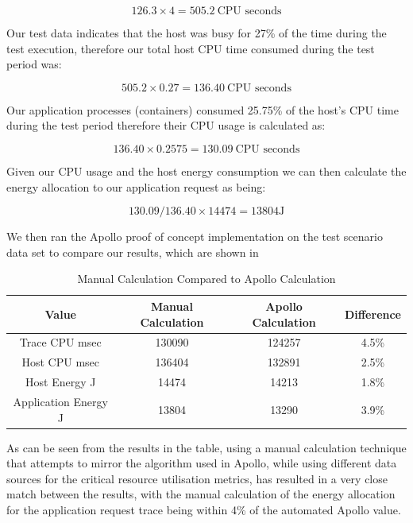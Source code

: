 \begin{equation}
126.3 \times 4 = 505.2 ~\text{CPU seconds}
\end{equation}

Our test data indicates that the host was busy for 27\% of the time during the test execution, therefore our total host CPU time consumed during the test period was:

\begin{equation}
505.2 \times 0.27 = 136.40 ~\text{CPU seconds}
\end{equation}

Our application processes (containers) consumed 25.75\% of the host's CPU time during the test period therefore their CPU usage is calculated as:

\begin{equation}
136.40 \times 0.2575 = 130.09 ~\text{CPU seconds}
\end{equation}

Given our CPU usage and the host energy consumption we can then calculate the energy allocation to our application request as being:

\begin{equation}
130.09 / 136.40 \times 14474 = 13804\text{J}
\end{equation}

We then ran the Apollo proof of concept implementation on the test scenario data set to compare our results, which are shown in 

\begin{table}
\centering
\caption{Manual Calculation Compared to Apollo Calculation}
\label{table:calculationresults}
\footnotesize
\begin{tabular}{|c|c|c|c|}
\hline
Value & Manual Calculation & Apollo Calculation & Difference \\
\hline
\hline
Trace CPU msec       & 130090 & 124257 & 4.5\% \\
Host CPU msec        & 136404 & 132891 & 2.5\% \\
Host Energy J        & 14474  & 14213  & 1.8\% \\
Application Energy J & 13804  & 13290  & 3.9\% \\
\hline
\end{tabular}
\end{table}

As can be seen from the results in the table, using a manual calculation technique that attempts to mirror the algorithm used in Apollo, while using different data sources for the critical resource utilisation metrics, has resulted in a very close match between the results, with the manual calculation of the energy allocation for the application request trace being within 4\% of the automated Apollo value.

